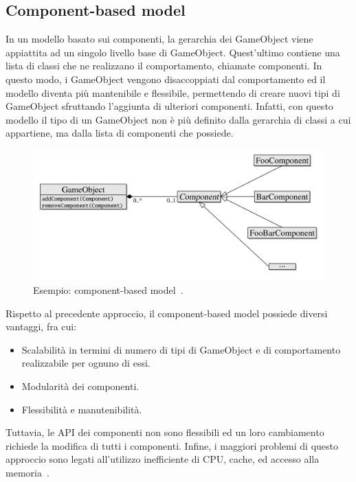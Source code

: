 \subsection{Component-based model}
In un modello basato sui componenti, la gerarchia dei GameObject viene appiattita ad un singolo livello base di GameObject. Quest'ultimo contiene una lista di classi che ne realizzano il comportamento, chiamate componenti.
In questo modo, i GameObject vengono disaccoppiati dal comportamento ed il modello diventa più mantenibile e flessibile, permettendo di creare nuovi tipi di GameObject sfruttando l'aggiunta di ulteriori componenti. Infatti, con questo modello il tipo di un GameObject non è più definito dalla gerarchia di classi a cui appartiene, ma dalla lista di componenti che possiede.

\begin{figure}[!ht]
    \centering
    \includegraphics[width=0.95\columnwidth]{gfx/imgs/chapter1/ComponentBasedModel.png}
    \caption{Esempio: component-based model~\cite{article:game-architecture-models}.}
    \label{fig:component-based-model}
\end{figure}

Rispetto al precedente approccio, il component-based model possiede diversi vantaggi, fra cui:
\begin{itemize}
    \item Scalabilità in termini di numero di tipi di GameObject e di comportamento realizzabile per ognuno di essi. 
    \item Modularità dei componenti.
    \item Flessibilità e manutenibilità.
\end{itemize}

Tuttavia, le API dei componenti non sono flessibili ed un loro cambiamento richiede la modifica di tutti i componenti. Infine, i maggiori problemi di questo approccio sono legati all'utilizzo inefficiente di CPU, cache, ed accesso alla memoria~\cite{article:game-architecture-models}.

